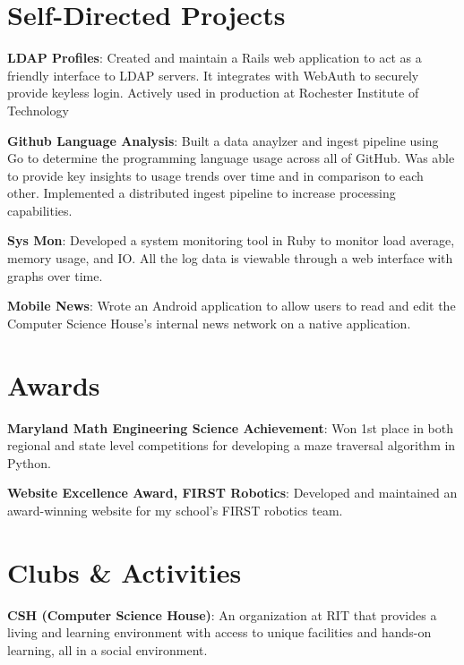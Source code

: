 \documentclass[a4paper,margin,line]{resume}
\begin{document}
\begin{resume}
\section{\mysidestyle Self-Directed Projects}
    \begin{asparablank}
        \item \textbf{LDAP Profiles}: Created and maintain a Rails web 
            application to act as a friendly interface to LDAP servers. 
            It integrates with WebAuth to securely provide keyless login. 
            Actively used in production at Rochester Institute of Technology \\
        \item \textbf{Github Language Analysis}: Built a data anaylzer and
            ingest pipeline using Go to determine the programming language 
            usage across all of GitHub. Was able to provide key insights to usage
            trends over time and in comparison to each other. Implemented a 
            distributed ingest pipeline to increase processing capabilities. \\
        \item \textbf{Sys Mon}: Developed a system monitoring tool in Ruby to monitor
            load average, memory usage, and IO. All the log
            data is viewable through a web interface with graphs over time. \\
        \item \textbf{Mobile News}: Wrote an Android application to allow users to read 
            and edit the Computer Science House’s internal news network on a 
            native application. \\
    \end{asparablank}
\section{\mysidestyle Awards}
    \begin{asparablank}
        \item \textbf{Maryland Math Engineering Science Achievement}: Won 1st place
            in both regional and state level competitions for developing a maze
            traversal algorithm in Python. \\
        \item \textbf{Website Excellence Award, FIRST Robotics}: Developed and maintained an
            award-winning website for my school's FIRST robotics team.
    \end{asparablank}
\section{\mysidestyle Clubs \& Activities}
    \begin{asparablank}
        \item \textbf{CSH (Computer Science House)}: An organization at RIT that
            provides a living and learning environment with access to unique facilities
            and hands-on learning, all in a social environment.
    \end{asparablank}
\end{resume}
\end{document}
